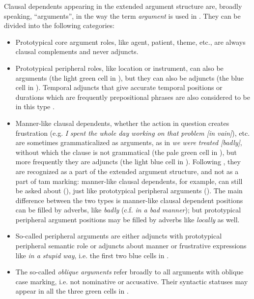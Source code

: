 \documentclass[UTF8, a4paper, oneside, scheme=plain, 12pt]{ctexbook}
\newcommand*{\citesec}[1]{\S~{#1}}
\newcommand*{\term}[1]{\emph{#1}}
\newcommand{\form}[1]{\emph{#1}}
\begin{document}
Clausal dependents appearing in the extended argument structure 
are, broadly speaking, ``arguments'', 
in the way the term \term{argument} is used in \citet{dixon2009basic1}.
They can be divided into the following categories: 
\begin{itemize}
    \item Prototypical core argument roles, 
    like agent, patient, theme, etc.,
    are always clausal complements and never adjuncts.
    \item Prototypical peripheral roles, like location or instrument, can also be arguments
    (the light green cell in ),
    but they can also be adjuncts
    (the blue cell in ).
    Temporal adjuncts that give accurate temporal positions or durations 
    which are frequently prepositional phrases 
    are also considered to be in this type
    \citep[\citesec{1.5}]{cinque1999adverbs}. 

    \item Manner-like clausal dependents, whether the action in question creates frustration 
    (e.g. \form{I spent the whole day working on that problem [in vain]}), etc.
    are sometimes grammaticalized as arguments,
    as in \form{we were treated [badly]},
    without which the clause is not grammatical
    (the pale green cell in ),
    but more frequently they are adjuncts
    (the light blue cell in ).
    Following \citet[\citesec{1.5}]{cinque1999adverbs},
    they are recognized as a part of the extended argument structure, 
    and not as a part of \acs{tam} marking:
    manner-like clausal dependents, for example,  
    can still be asked about (), 
    just like prototypical peripheral arguments (). 
    The main difference between the two types 
    is manner-like clausal dependent positions can be filled by adverbs, like 
    \form{badly} (c.f. \form{in a bad manner});
    but prototypical peripheral argument positions may be filled 
    by adverbs like \form{locally} as well.

    \item So-called peripheral arguments
    are either adjuncts with prototypical peripheral semantic role
    or adjuncts about manner or frustrative expressions like \form{in a stupid way},
    i.e. the first two blue cells in .
    \item The so-called \term{oblique arguments}
    refer broadly to all arguments with oblique case marking, i.e. not nominative or accusative.
    Their syntactic statuses may appear in 
    all the three green cells in .
\end{itemize}
\end{document}
